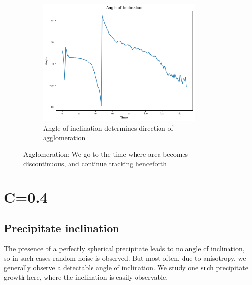 \documentclass[12pt, a4paper]{report}
\begin{document}
\begin{figure}[H]
\begin{subfigure}{.45\textwidth}
  \includegraphics[width=0.9\textwidth]{Pictures/Results/2angle.jpeg}
  \caption{Angle of inclination determines direction of agglomeration}
  \label{img:microstrImg}
\end{subfigure}
\caption{Agglomeration: We go to the time where area becomes discontinuous, and continue tracking henceforth}
\label{fig:test}
\end{figure}

\section{C=0.4}

\subsection{Precipitate inclination}
The presence of a perfectly spherical precipitate leads to no angle of inclination, so in such cases random noise is observed. But most often, due to anisotropy, we generally observe a detectable angle of inclination. We study one such precipitate growth here, where the inclination is easily observable.
\end{document}
